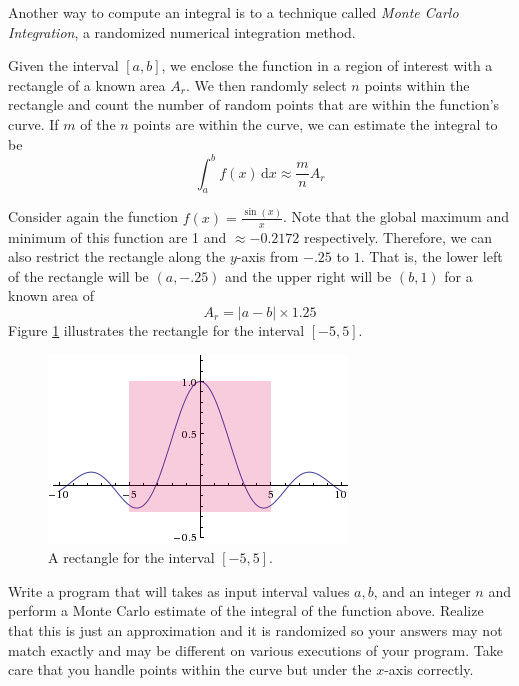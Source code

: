 \begin{exer}
Another way to compute an integral is to a technique called \emph{Monte Carlo Integration}, 
a randomized numerical integration method.

Given the interval $[a, b]$, we enclose the function in a region of interest with a rectangle of a known
area $A_r$.  We then randomly select $n$ points within the rectangle and count the number of random
points that are within the function's curve.  If $m$ of the $n$ points are within the curve, we can estimate
the integral to be
 $$\int_a^b \! f(x) \, \mathrm{d} x \approx \frac{m}{n}A_r$$

Consider again the function $f(x) = \frac{\sin(x)}{x}$.  Note that the global maximum and 
minimum of this function are 1 and $\approx -0.2172$ respectively.
Therefore, we can also restrict the rectangle along the $y$-axis from $-.25$ to $1$.  That is, the lower
left of the rectangle will be $(a, -.25)$ and the upper right will be $(b, 1)$ for a known area of
 $$A_r = |a - b| \times 1.25$$
Figure \ref{fig:sinxxRect} illustrates the rectangle for the interval $[-5, 5]$.

\begin{figure}[h]
\centering
\includegraphics[scale=.75]{images/sinxxRect.png}
\caption{A rectangle for the interval $[-5, 5]$.}
\label{fig:sinxxRect}
\end{figure}

Write a program that will takes as input interval values $a, b$, and an integer $n$ and 
perform a Monte Carlo estimate of the integral of the function above.  Realize that this 
is just an approximation and it is randomized so your answers may not match exactly
and may be different on various executions of your program.  Take care that you handle 
points within the curve but under the $x$-axis correctly.
\end{exer}


